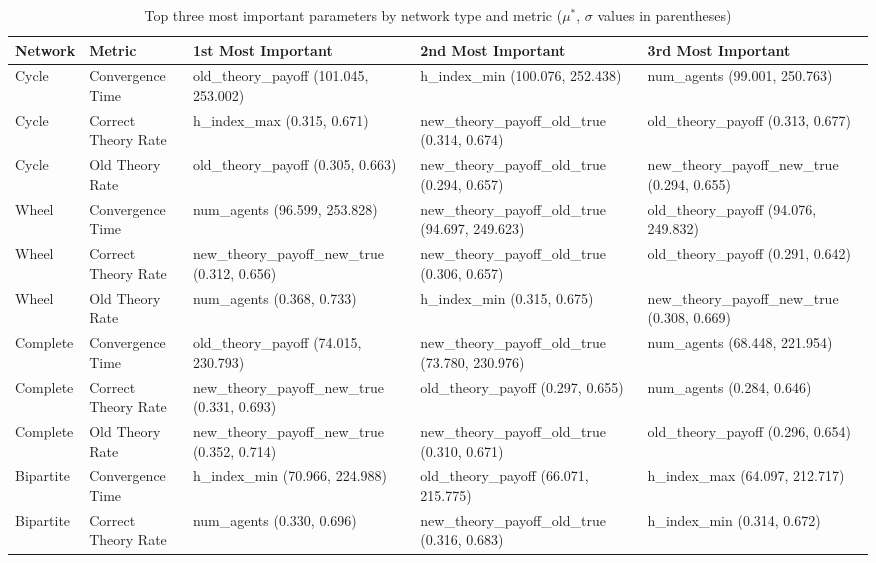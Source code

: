 \begin{table*}[htbp]
\centering
\caption{Top three most important parameters by network type and metric ($\mu^*$, $\sigma$ values in parentheses)}
\label{tab:sensitivity_summary}
\footnotesize
\begin{tabular}{llp{2.8cm}p{2.8cm}p{2.8cm}}
\toprule
\textbf{Network} & \textbf{Metric} & \textbf{1st Most Important} & \textbf{2nd Most Important} & \textbf{3rd Most Important} \\
\midrule
Cycle & Convergence Time & old\_theory\_payoff (101.045, 253.002) & h\_index\_min (100.076, 252.438) & num\_agents (99.001, 250.763) \\
Cycle & Correct Theory Rate & h\_index\_max (0.315, 0.671) & new\_theory\_payoff\_old\_true (0.314, 0.674) & old\_theory\_payoff (0.313, 0.677) \\
Cycle & Old Theory Rate & old\_theory\_payoff (0.305, 0.663) & new\_theory\_payoff\_old\_true (0.294, 0.657) & new\_theory\_payoff\_new\_true (0.294, 0.655) \\
\midrule
Wheel & Convergence Time & num\_agents (96.599, 253.828) & new\_theory\_payoff\_old\_true (94.697, 249.623) & old\_theory\_payoff (94.076, 249.832) \\
Wheel & Correct Theory Rate & new\_theory\_payoff\_new\_true (0.312, 0.656) & new\_theory\_payoff\_old\_true (0.306, 0.657) & old\_theory\_payoff (0.291, 0.642) \\
Wheel & Old Theory Rate & num\_agents (0.368, 0.733) & h\_index\_min (0.315, 0.675) & new\_theory\_payoff\_new\_true (0.308, 0.669) \\
\midrule
Complete & Convergence Time & old\_theory\_payoff (74.015, 230.793) & new\_theory\_payoff\_old\_true (73.780, 230.976) & num\_agents (68.448, 221.954) \\
Complete & Correct Theory Rate & new\_theory\_payoff\_new\_true (0.331, 0.693) & old\_theory\_payoff (0.297, 0.655) & num\_agents (0.284, 0.646) \\
Complete & Old Theory Rate & new\_theory\_payoff\_new\_true (0.352, 0.714) & new\_theory\_payoff\_old\_true (0.310, 0.671) & old\_theory\_payoff (0.296, 0.654) \\
\midrule
Bipartite & Convergence Time & h\_index\_min (70.966, 224.988) & old\_theory\_payoff (66.071, 215.775) & h\_index\_max (64.097, 212.717) \\
Bipartite & Correct Theory Rate & num\_agents (0.330, 0.696) & new\_theory\_payoff\_old\_true (0.316, 0.683) & h\_index\_min (0.314, 0.672) \\

\end{tabular}
\end{table*}
